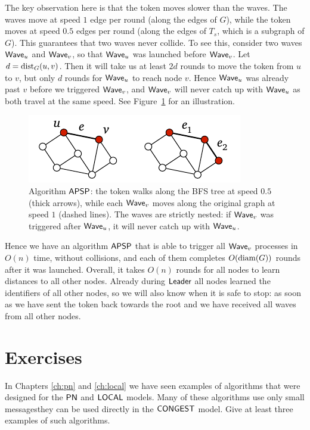 The key observation here is that the token moves slower than the waves. The waves move at speed $1$ edge per round (along the edges of $G$), while the token moves at speed $0.5$ edges per round (along the edges of $T_s$, which is a subgraph of $G$). This guarantees that two waves never collide. To see this, consider two waves $\textup{\sffamily Wave}_u$ and $\textup{\sffamily Wave}_v$, so that $\textup{\sffamily Wave}_u$ was launched before $\textup{\sffamily Wave}_v$. Let $d = \operatorname{dist}_G(u,v)$. Then it will take us at least $2d$ rounds to move the token from $u$ to $v$, but only $d$ rounds for $\textup{\sffamily Wave}_u$ to reach node $v$. Hence $\textup{\sffamily Wave}_u$ was already past $v$ before we triggered $\textup{\sffamily Wave}_v$, and $\textup{\sffamily Wave}_v$ will never catch up with $\textup{\sffamily Wave}_u$ as both travel at the same speed. See Figure~\ref{fig:pipeline} for an illustration.

\begin{figure}
    \centering
    \includegraphics[page=\PPipeline]{figs.pdf}
    \caption{Algorithm $\textup{\sffamily APSP}$: the token walks along the BFS tree at speed $0.5$ (thick arrows), while each $\textup{\sffamily Wave}_v$ moves along the original graph at speed $1$ (dashed lines). The waves are strictly nested: if $\textup{\sffamily Wave}_v$ was triggered after $\textup{\sffamily Wave}_u$, it will never catch up with $\textup{\sffamily Wave}_u$.}\label{fig:pipeline}
\end{figure}

Hence we have an algorithm $\textup{\sffamily APSP}$ that is able to trigger all $\textup{\sffamily Wave}_v$ processes in $O(n)$ time, without collisions, and each of them completes $O(\operatorname{diam}(G))$ rounds after it was launched. Overall, it takes $O(n)$ rounds for all nodes to learn distances to all other nodes. Already during $\textup{\sffamily Leader}$ all nodes learned the identifiers of all other nodes, so we will also know when it is safe to stop: as soon as we have sent the token back towards the root and we have received all waves from all other nodes.


\section{Exercises}

\begin{ex}\label{ex:congest-prior}
    In Chapters \ref{ch:pn} and \ref{ch:local} we have seen examples of algorithms that were designed for the $\textup{\sffamily PN}$ and $\textup{\sffamily LOCAL}$ models. Many of these algorithms use only small messages\mydash they can be used directly in the $\textup{\sffamily CONGEST}$ model. Give at least three examples of such algorithms.
\end{ex}

